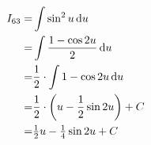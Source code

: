\newpage
\def\no{63}
\def\theintegral{\(\int\sin^2{u}\;\dif{u}
\enspace=\enspace%
\tfrac{1}{2}\,{u}\;-\;\tfrac{1}{4}\,\sin{2{u}}\;+\;C\)}

\begin{align*}
{I}_{\no}
=&  \int  \sin^2{u} \dif u \\
=&  \int  \frac{1-\cos{2u}}{2} \dif u \\
=&  \frac{1}{2}\cdot\int  1-\cos{2u}  \dif u \\
=&  \frac{1}{2}\cdot \left(
      {u}-\frac{1}{2}\sin{2u}
    \right) + C \\
=&  \tfrac{1}{2} {u}
   -\tfrac{1}{4} \sin{2u} + C
\\
\end{align*}
